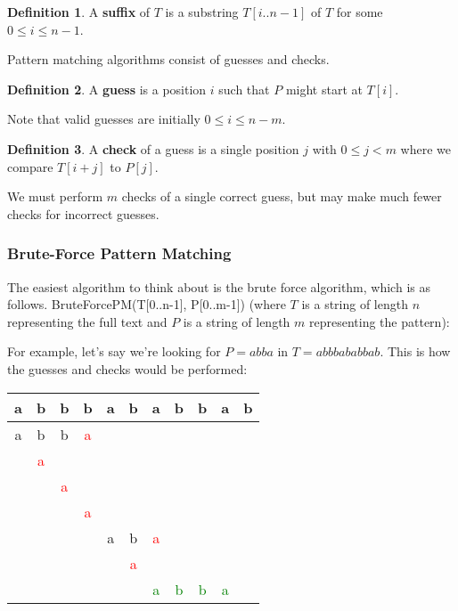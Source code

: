 \documentclass[]{article}
\theoremstyle{definition}
\newtheorem*{defn}{Definition}
\begin{document}
			\begin{defn}
				A \textbf{suffix} of $T$ is a substring $T[i..n-1]$ of $T$ for some $0 \le i \le n - 1$.
			\end{defn}

			Pattern matching algorithms consist of guesses and checks.
			\begin{defn}
				A \textbf{guess} is a position $i$ such that $P$ might start at $T[i]$.
			\end{defn}

			Note that valid guesses are initially $0 \le i \le n - m$.

			\begin{defn}
				A \textbf{check} of a guess is a single position $j$ with $0 \le j < m$ where we compare $T[i + j]$ to $P[j]$.
			\end{defn}

			We must perform $m$ checks of a single correct guess, but may make much fewer checks for incorrect guesses.

			\subsubsection{Brute-Force Pattern Matching}
				The easiest algorithm to think about is the brute force algorithm, which is as follows. BruteForcePM(T[0..n-1], P[0..m-1]) (where $T$ is a string of length $n$ representing the full text and $P$ is a string of length $m$ representing the pattern): \\
				\begin{algorithm}[H]
				\end{algorithm}

				For example, let's say we're looking for $P = abba$ in $T = abbbababbab$. This is how the guesses and checks would be performed:
				\begin{center}
					\begin{tabular}{|c|c|c|c|c|c|c|c|c|c|c|}
						\hline
						\textbf{a} & \textbf{b} & \textbf{b} & \textbf{b} & \textbf{a} & \textbf{b} & \textbf{a} & \textbf{b} & \textbf{b} & \textbf{a} & \textbf{b} \\ \hline
						a & b & b & \textcolor{red}{a} & & & & & & & \\
						& \textcolor{red}{a} & & & & & & & & & \\
						& & \textcolor{red}{a} & & & & & & & & \\
						& & & \textcolor{red}{a} & & & & & & & \\
						& & & & a & b & \textcolor{red}{a} & & & & \\
						& & & & & \textcolor{red}{a} & & & & & \\
						& & & & & & \textcolor{green}{a} & \textcolor{green}{b} & \textcolor{green}{b} & \textcolor{green}{a} & \\
						\hline
					\end{tabular}
				\end{center}
\end{document}
